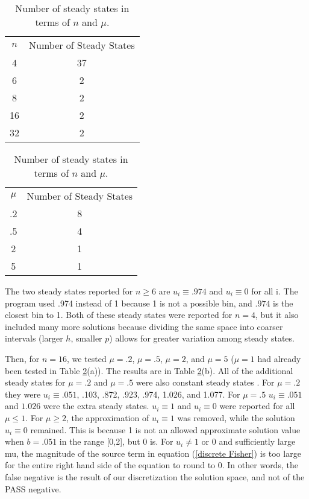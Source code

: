 \documentclass{article}
\newcommand{\bhline}{\Xhline{2\arrayrulewidth}}
\begin{document}
\begin{table}
\begin{center}

\begin{tabular}{ | c | c | }
\hline
$n$ & Number of Steady States \\
\bhline
4 & 37 \\
\hline
6 & 2 \\
\hline
8 & 2 \\ 
\hline
16 & 2 \\
\hline
32 & 2 \\
\hline
\end{tabular}
\hspace{.5in}
\begin{tabular}{ | c | c | }
\hline
$\mu$ & Number of Steady States \\
\bhline
.2 & 8 \\
\hline
.5 & 4 \\ 
\hline
2 & 1 \\ %
\hline
5 & 1 \\
\hline
\end{tabular}

\caption{Number of steady states in terms of $n$ and $\mu$.}
\label{Fisher Statistics}
\end{center}
\end{table}

The two steady states reported for $n \ge 6$ are $u_i \equiv .974$ and $u_i \equiv 0$ for all i. The program used .974 instead of 1 because 1 is not a possible bin, and $.974$ is the closest bin to 1. Both of these steady states were reported for $n = 4$, but it also included many more solutions because dividing the same space into coarser intervals (larger $h$, smaller $p$) allows for greater variation among steady states.

Then, for $n = 16$, we tested $\mu = .2$, $\mu = .5$, $\mu = 2$, and $\mu = 5$ ($\mu = 1$ had already been tested in Table \ref{Fisher Statistics}(a)). The results are in Table \ref{Fisher Statistics}(b). All of the additional steady states for $\mu = .2$ and $\mu = .5$ were also constant steady states . For $\mu = .2$ they were $u_i \equiv .051$, .103, .872, .923, .974, 1.026, and 1.077. For $\mu = .5$ $u_i \equiv .051$ and $1.026$ were the extra steady states. $u_i \equiv 1$ and $u_i \equiv 0$ were reported for all $\mu \le 1$. For $\mu \ge 2$, the approximation of $u_i \equiv 1$ was removed, while the solution $u_i \equiv 0$ remained. This is because 1 is not an allowed approximate solution value when $b = .051$ in the range [0,2], but 0 is. For $u_i \ne 1$ or $0$ and sufficiently large mu, the magnitude of the source term in equation (\ref{discrete Fisher}) is too large for the entire right hand side of the equation to round to 0. In other words, the false negative is the result of our discretization the solution space, and not of the PASS negative.
\end{document}
